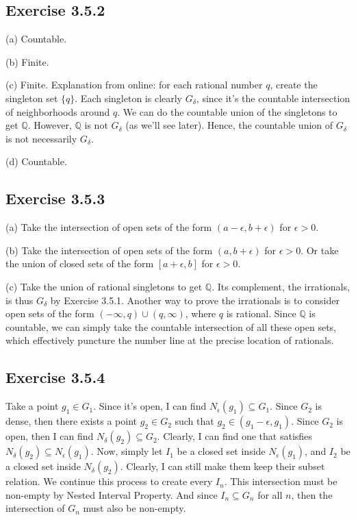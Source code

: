 \documentclass{book}
\begin{document}
\subsection*{Exercise 3.5.2}
(a)
Countable.

\noindent
(b)
Finite.

\noindent
(c)
Finite. Explanation from online: for each rational number $q$, create the singleton set $\{ q \}$. Each singleton is clearly $G_\delta$, since it's the countable intersection of neighborhoods around $q$. We can do the countable union of the singletons to get $\mathbb{Q}$. However, $\mathbb{Q}$ is not $G_\delta$ (as we'll see later). Hence, the countable union of $G_\delta$ is not necessarily $G_\delta$.

\noindent
(d)
Countable.

\subsection*{Exercise 3.5.3}
(a)
Take the intersection of open sets of the form $(a - \epsilon, b + \epsilon)$ for $\epsilon > 0$.

\noindent
(b)
Take the intersection of open sets of the form $(a, b + \epsilon)$ for $\epsilon > 0$. Or take the union of closed sets of the form $[a + \epsilon, b]$ for $\epsilon > 0$.

\noindent
(c)
Take the union of rational singletons to get $\mathbb{Q}$. Its complement, the irrationals, is thus $G_\delta$ by Exercise 3.5.1. Another way to prove the irrationals is to consider open sets of the form $(-\infty, q) \cup (q, \infty)$, where $q$ is rational. Since $\mathbb{Q}$ is countable, we can simply take the countable intersection of all these open sets, which effectively puncture the number line at the precise location of rationals.

\subsection*{Exercise 3.5.4}
Take a point $g_1 \in G_1$. Since it's open, I can find $N_\epsilon (g_1) \subseteq G_1$. Since $G_2$ is dense, then there exists a point $g_2 \in G_2$ such that $g_2 \in (g_1 - \epsilon, g_1)$. Since $G_2$ is open, then I can find $N_\delta (g_2) \subseteq G_2$. Clearly, I can find one that satisfies $N_\delta (g_2) \subseteq N_\epsilon (g_1)$. Now, simply let $I_1$ be a closed set inside $N_\epsilon (g_1)$, and $I_2$ be a closed set inside $N_\delta (g_2)$. Clearly, I can still make them keep their subset relation. We continue this process to create every $I_n$. This intersection must be non-empty by Nested Interval Property. And since $I_n \subseteq G_n$ for all $n$, then the intersection of $G_n$ must also be non-empty.
\end{document}
